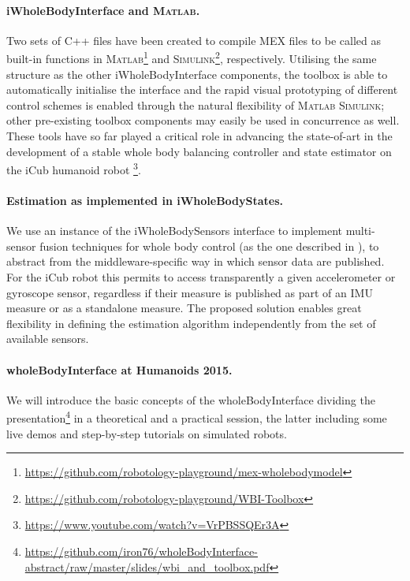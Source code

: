\documentclass[11pt]{article}
\newcommand\textvtt[1]{{\normalfont\fontfamily{cmvtt}\selectfont #1}}
\begin{document}
\paragraph{\textvtt{iWholeBodyInterface} and \textsc{Matlab}.}

Two sets of C++ files have been created to compile {MEX} files to be called as built-in functions in \textsc{Matlab}\footnote{\protect\url{https://github.com/robotology-playground/mex-wholebodymodel}} and \textsc{Simulink}\footnote{\protect\url{https://github.com/robotology-playground/WBI-Toolbox}}, respectively. Utilising the same structure as the other \textvtt{iWholeBodyInterface} components, the toolbox is able to automatically initialise the interface and the rapid visual prototyping of different control schemes is enabled through the natural flexibility of \textsc{Matlab} \textsc{Simulink}; other pre-existing toolbox components may easily be used in concurrence as well. These tools have so far played a critical role in advancing the state-of-art in the development of a stable whole body balancing controller and state estimator on the iCub humanoid robot \footnote{\protect\url{https://www.youtube.com/watch?v=VrPBSSQEr3A}}.


\paragraph{Estimation as implemented in \textvtt{iWholeBodyStates}.}
We use an instance of the \textvtt{iWholeBodySensors} interface to implement multi-sensor fusion techniques for whole body control (as the one described in \cite{nori15}), to abstract from the middleware-specific way in which sensor data are published. For the iCub robot this permits to access transparently a given accelerometer or gyroscope sensor, regardless if their measure is published as part of an IMU measure or as a standalone measure. The proposed solution enables great flexibility in defining the estimation algorithm independently from the set of available sensors.

\paragraph{\textvtt{wholeBodyInterface} at Humanoids 2015.} We will introduce the basic concepts of the \textvtt{wholeBodyInterface} dividing the presentation\footnote{\protect\url{https://github.com/iron76/wholeBodyInterface-abstract/raw/master/slides/wbi_and_toolbox.pdf}} in a theoretical and a practical session, the latter including some live demos and step-by-step tutorials on simulated robots. 





\end{document}
